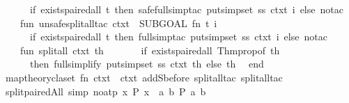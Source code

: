 \begin{isabellebody}
\ \ \ \ \ \ if\ exists{\isacharunderscore}{\kern0pt}paired{\isacharunderscore}{\kern0pt}all\ t\ then\ safe{\isacharunderscore}{\kern0pt}full{\isacharunderscore}{\kern0pt}simp{\isacharunderscore}{\kern0pt}tac\ {\isacharparenleft}{\kern0pt}put{\isacharunderscore}{\kern0pt}simpset\ ss\ ctxt{\isacharparenright}{\kern0pt}\ i\ else\ no{\isacharunderscore}{\kern0pt}tac{\isacharparenright}{\kern0pt}{\isacharsemicolon}{\kern0pt}\isanewline
\isanewline
\ \ \ \ fun\ unsafe{\isacharunderscore}{\kern0pt}split{\isacharunderscore}{\kern0pt}all{\isacharunderscore}{\kern0pt}tac\ ctxt\ {\isacharequal}{\kern0pt}\ SUBGOAL\ {\isacharparenleft}{\kern0pt}fn\ {\isacharparenleft}{\kern0pt}t{\isacharcomma}{\kern0pt}\ i{\isacharparenright}{\kern0pt}\ {\isacharequal}{\kern0pt}{\isachargreater}{\kern0pt}\isanewline
\ \ \ \ \ \ if\ exists{\isacharunderscore}{\kern0pt}paired{\isacharunderscore}{\kern0pt}all\ t\ then\ full{\isacharunderscore}{\kern0pt}simp{\isacharunderscore}{\kern0pt}tac\ {\isacharparenleft}{\kern0pt}put{\isacharunderscore}{\kern0pt}simpset\ ss\ ctxt{\isacharparenright}{\kern0pt}\ i\ else\ no{\isacharunderscore}{\kern0pt}tac{\isacharparenright}{\kern0pt}{\isacharsemicolon}{\kern0pt}\isanewline
\isanewline
\ \ \ \ fun\ split{\isacharunderscore}{\kern0pt}all\ ctxt\ th\ {\isacharequal}{\kern0pt}\isanewline
\ \ \ \ \ \ if\ exists{\isacharunderscore}{\kern0pt}paired{\isacharunderscore}{\kern0pt}all\ {\isacharparenleft}{\kern0pt}Thm{\isachardot}{\kern0pt}prop{\isacharunderscore}{\kern0pt}of\ th{\isacharparenright}{\kern0pt}\isanewline
\ \ \ \ \ \ then\ full{\isacharunderscore}{\kern0pt}simplify\ {\isacharparenleft}{\kern0pt}put{\isacharunderscore}{\kern0pt}simpset\ ss\ ctxt{\isacharparenright}{\kern0pt}\ th\ else\ th{\isacharsemicolon}{\kern0pt}\isanewline
\ \ end{\isacharsemicolon}{\kern0pt}\isanewline
{\isacartoucheclose}\isanewline
\isanewline
{}\isamarkupfalse%
\ {\isacartoucheopen}map{\isacharunderscore}{\kern0pt}theory{\isacharunderscore}{\kern0pt}claset\ {\isacharparenleft}{\kern0pt}fn\ ctxt\ {\isacharequal}{\kern0pt}{\isachargreater}{\kern0pt}\ ctxt\ addSbefore\ {\isacharparenleft}{\kern0pt}{\isachardoublequote}{\kern0pt}split{\isacharunderscore}{\kern0pt}all{\isacharunderscore}{\kern0pt}tac{\isachardoublequote}{\kern0pt}{\isacharcomma}{\kern0pt}\ split{\isacharunderscore}{\kern0pt}all{\isacharunderscore}{\kern0pt}tac{\isacharparenright}{\kern0pt}{\isacharparenright}{\kern0pt}{\isacartoucheclose}%
\endisatagML
{\isafoldML}%
%
\isadelimML
\isanewline
%
\endisadelimML
\isanewline
{}\isamarkupfalse%
\ split{\isacharunderscore}{\kern0pt}paired{\isacharunderscore}{\kern0pt}All\ {\isacharbrackleft}{\kern0pt}simp{\isacharcomma}{\kern0pt}\ no{\isacharunderscore}{\kern0pt}atp{\isacharbrackright}{\kern0pt}{\isacharcolon}{\kern0pt}\ {\isachardoublequoteopen}{\isacharparenleft}{\kern0pt}{\isasymforall}x{\isachardot}{\kern0pt}\ P\ x{\isacharparenright}{\kern0pt}\ {\isasymlongleftrightarrow}\ {\isacharparenleft}{\kern0pt}{\isasymforall}a\ b{\isachardot}{\kern0pt}\ P\ {\isacharparenleft}{\kern0pt}a{\isacharcomma}{\kern0pt}\ b{\isacharparenright}{\kern0pt}{\isacharparenright}{\kern0pt}{\isachardoublequoteclose}\isanewline

\end{isabellebody}
